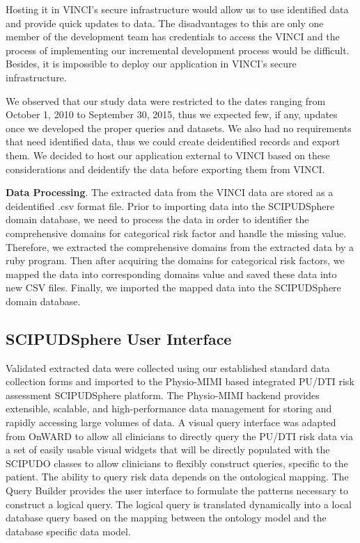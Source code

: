 \documentclass{amia}
\begin{document}
Hosting it in VINCI's secure infrastructure would allow us to use identified data and provide quick updates to data. The disadvantages to this are only one member of the development team has credentials to access the VINCI and the process of implementing our incremental development process would be difficult. Besides, it is impossible to deploy our application in VINCI's secure infrastructure.

We observed that our study data were restricted to the dates ranging from October 1, 2010 to September 30, 2015, thus we expected few, if any, updates once we developed the proper queries and datasets. We also had no requirements that need identified data, thus we could create deidentified records and export them. We decided to host our application external to VINCI based on these considerations and deidentify the data before exporting them from VINCI.

{\bf Data Processing}. The extracted data from the VINCI data are stored as a deidentified .csv format file. Prior to importing data into the SCIPUDSphere domain database, we need to process the data in order to identifier the comprehensive domains for categorical risk factor and handle the missing value. Therefore, we extracted the comprehensive domains from the extracted data by a ruby program. Then after acquiring the domains for categorical risk factors, we mapped the data into corresponding domains value and saved these data into new CSV files. Finally, we imported the mapped data into the SCIPUDSphere domain database.

\subsection{SCIPUDSphere User Interface}
Validated extracted data were collected using our established standard data collection forms and imported to the Physio-MIMI based integrated PU/DTI risk assessment SCIPUDSphere platform. The Physio-MIMI backend provides extensible, scalable, and high-performance data management for storing and rapidly accessing large volumes of data. A visual query interface was adapted from OnWARD to allow all clinicians to directly query the PU/DTI risk data via a set of easily usable visual widgets that will be directly populated with the SCIPUDO classes to allow clinicians to flexibly construct queries, specific to the patient. The ability to query risk data depends on the ontological mapping. The Query Builder provides the user interface to formulate the patterns necessary to construct a logical query. The logical query is translated dynamically into a local database query based on the mapping between the ontology model and the database specific data model.
\end{document}
